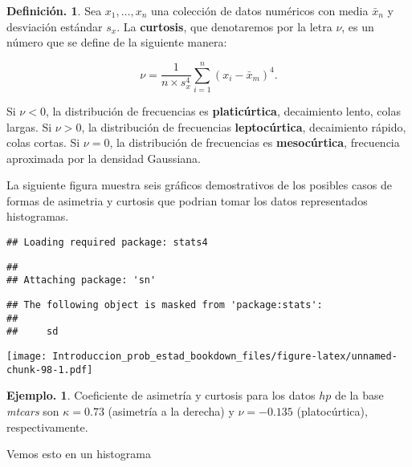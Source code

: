 \documentclass[]{book}
\newenvironment{Shaded}{\begin{snugshade}}{\end{snugshade}}
\newcommand{\DataTypeTok}[1]{\textcolor[rgb]{0.13,0.29,0.53}{#1}}
\newcommand{\KeywordTok}[1]{\textcolor[rgb]{0.13,0.29,0.53}{\textbf{#1}}}
\newcommand{\NormalTok}[1]{#1}
\newcommand{\OperatorTok}[1]{\textcolor[rgb]{0.81,0.36,0.00}{\textbf{#1}}}
\newcommand{\StringTok}[1]{\textcolor[rgb]{0.31,0.60,0.02}{#1}}
\theoremstyle{definition}
\newtheorem{definition}{Definición.}[chapter]
\theoremstyle{definition}
\newtheorem{example}{Ejemplo.}[chapter]
\theoremstyle{definition}
\theoremstyle{remark}
\begin{document}
\begin{definition}
\protect\hypertarget{def:unnamed-chunk-97}{}{\label{def:unnamed-chunk-97} }
Sea \(x_1, \ldots , x_n\) una colección de datos numéricos
con media \(\bar{x}_n\) y desviación
estándar \(s_x\). La \textbf{curtosis}, que denotaremos por la
letra \(\nu\), es un número que
se define de la siguiente manera:

\[ \nu =  \frac{1}{n \times s_x^4} \sum_{i=1}^n (x_i -
                                      \bar{x}_m)^4.\]

Si \(\nu<0\), la distribución de frecuencias es
\textbf{platicúrtica}, decaimiento lento, colas largas.
Si \(\nu>0\), la distribución de frecuencias
\textbf{leptocúrtica}, decaimiento rápido, colas cortas. Si
\(\nu=0\), la distribución de frecuencias es
\textbf{mesocúrtica}, frecuencia aproximada por la densidad
Gaussiana.
\end{definition}

La siguiente figura muestra seis gráficos demostrativos de los
posibles casos de formas de asimetria y curtosis que podrian tomar los
datos representados histogramas.

\begin{verbatim}
## Loading required package: stats4
\end{verbatim}

\begin{verbatim}
## 
## Attaching package: 'sn'
\end{verbatim}

\begin{verbatim}
## The following object is masked from 'package:stats':
## 
##     sd
\end{verbatim}

\texttt{[image: Introduccion\_prob\_estad\_bookdown\_files/figure-latex/unnamed-chunk-98-1.pdf]}

\begin{example}
\protect\hypertarget{exm:unnamed-chunk-99}{}{\label{exm:unnamed-chunk-99} }Coeficiente de asimetría y curtosis para los datos
\(hp\) de la base \emph{mtcars} son \(\kappa = 0.73\)
(asimetría a la derecha) y \(\nu = -0.135\)
(platocúrtica), respectivamente.
\end{example}

Vemos esto en un histograma

\begin{Shaded}
\end{Shaded}
\end{document}
